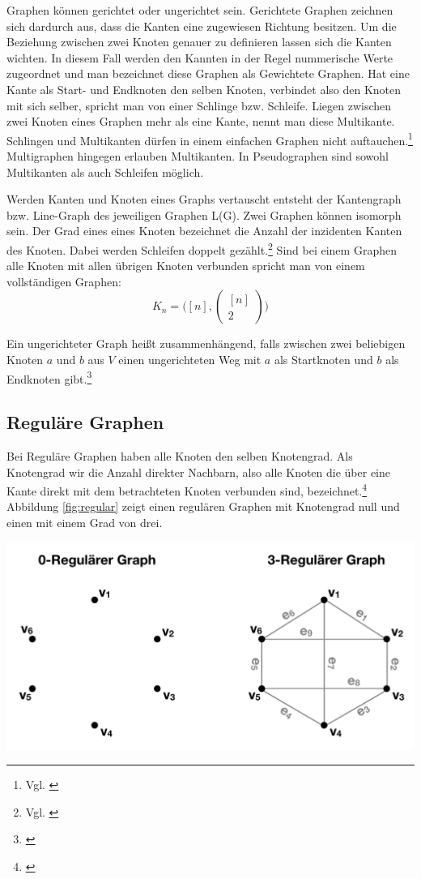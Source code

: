 Graphen können gerichtet oder ungerichtet sein.
Gerichtete Graphen zeichnen sich dardurch aus, dass die Kanten eine zugewiesen Richtung besitzen.
Um die Beziehung zwischen zwei Knoten genauer zu definieren lassen sich die Kanten wichten.
In diesem Fall werden den Kannten in der Regel nummerische Werte zugeordnet und man bezeichnet diese Graphen als Gewichtete Graphen.
Hat eine Kante als Start- und Endknoten den selben Knoten, verbindet also den Knoten mit sich selber, spricht man von einer Schlinge bzw. Schleife.
Liegen zwischen zwei Knoten eines Graphen mehr als eine Kante, nennt man diese Multikante.
Schlingen und Multikanten dürfen in einem einfachen Graphen nicht auftauchen.\footnote{Vgl. \cite{felsner01}}
Multigraphen hingegen erlauben Multikanten. In Pseudographen sind sowohl Multikanten als auch Schleifen möglich.

Werden Kanten und Knoten eines Graphs vertauscht entsteht der Kantengraph bzw. Line-Graph des jeweiligen Graphen L(G).
Zwei Graphen können isomorph sein.
Der Grad eines eines Knoten bezeichnet die Anzahl der inzidenten Kanten des Knoten.
Dabei werden Schleifen doppelt gezählt.\footnote{Vgl. \cite[Seite 13]{rahm2017}}
Sind bei einem Graphen alle Knoten mit allen übrigen Knoten verbunden spricht man von einem vollständigen Graphen:
	\[K_{n}=\big([n],\begin{pmatrix}
		[n] \\ 2
	\end{pmatrix}\big)\]

Ein ungerichteter Graph heißt zusammenhängend, falls zwischen zwei beliebigen Knoten $a$ und $b$ aus $V$ einen ungerichteten Weg mit $a$ als Startknoten und $b$ als Endknoten gibt.\footnote{\cite[36-38]{krumke2012graphentheoretische}}

\subsection{Reguläre Graphen}
Bei Reguläre Graphen haben alle Knoten den selben Knotengrad.
Als Knotengrad wir die Anzahl direkter Nachbarn, also alle Knoten die über eine Kante direkt mit dem betrachteten Knoten verbunden sind, bezeichnet.\footnote{\cite{felsner2012geometric}}
Abbildung \ref{fig:regular} zeigt einen regulären Graphen mit Knotengrad null und einen mit einem Grad von drei.
\begin{center}
	\includegraphics[scale = 0.4]{./images/Regulaerer_graph.png}
	\label{fig:regular}
\end{center}
